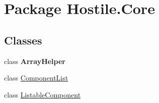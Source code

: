 \hypertarget{namespace_hostile_1_1_core}{\section{Package Hostile.\-Core}
\label{namespace_hostile_1_1_core}
}
\subsection*{Classes}
\begin{DoxyCompactItemize}
\item 
class {\bfseries Array\-Helper}
\item 
class \hyperlink{class_hostile_1_1_core_1_1_component_list}{Component\-List}
\item 
class \hyperlink{class_hostile_1_1_core_1_1_listable_component}{Listable\-Component}
\end{DoxyCompactItemize}
